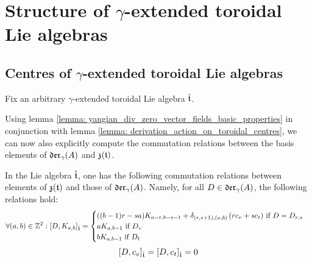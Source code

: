 \section{Structure of \texorpdfstring{$\gamma$}{}-extended toroidal Lie algebras}
    \subsection{Centres of \texorpdfstring{$\gamma$}{}-extended toroidal Lie algebras}
        Fix an arbitrary $\gamma$-extended toroidal Lie algebra $\hat{\mathfrak{t}}$.
    
        Using lemma \ref{lemma: yangian_div_zero_vector_fields_basic_properties} in conjunction with lemma \ref{lemma: derivation_action_on_toroidal_centres}, we can now also explicitly compute the commutation relations between the basis elements of $\mathfrak{der}_{\gamma}(A)$ and $\mathfrak{z}(\mathfrak{t})$.
        \begin{lemma} \label{lemma: explicit_commutators_between_central_basis_elements_and_derivations}
            In the Lie algebra $\hat{\mathfrak{t}}$, one has the following commutation relations between elements of $\mathfrak{z}(\mathfrak{t})$ and those of $\mathfrak{der}_{\gamma}(A)$. Namely, for all $D \in \mathfrak{der}_{\gamma}(A)$, the following relations hold:
                $$
                    \forall (a, b) \in \mathbb{Z}^2: [D, K_{a, b}]_{\hat{\mathfrak{t}}} =
                    \begin{cases}
                        \text{$((b - 1)r - sa) K_{a - r, b - s - 1} + \delta_{(r, s + 1), (a, b)} \left( r c_v + s c_t \right)$ if $D = D_{r, s}$}
                        \\
                        \text{$a K_{a, b - 1}$ if $D_v$}
                        \\
                        \text{$b K_{a, b - 1}$ if $D_t$}
                    \end{cases}
                $$
                $$[D, c_v]_{\hat{\mathfrak{t}}} = [D, c_t]_{\hat{\mathfrak{t}}} = 0$$
        \end{lemma}
